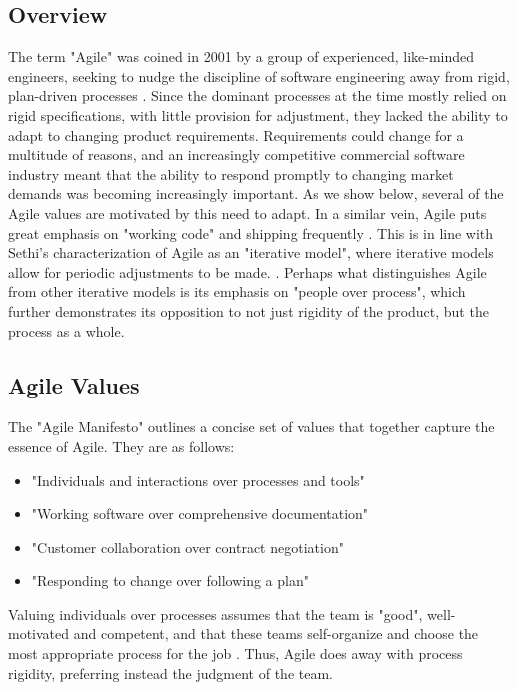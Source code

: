 \documentclass[11pt]{article}
\begin{document}
    \subsection{Overview}
    The term "Agile" was coined in 2001 by a group of experienced, like-minded engineers, seeking to nudge the discipline of software engineering away from rigid, plan-driven processes \citet{sethi}. Since the dominant processes at the time mostly relied on rigid specifications, with little provision for adjustment, they lacked the ability to adapt to changing product requirements. Requirements could change for a multitude of reasons, and an increasingly competitive commercial software industry meant that the ability to respond promptly to changing market demands was becoming increasingly important. As we show below, several of the Agile values are motivated by this need to adapt. In a similar vein, Agile puts great emphasis on "working code" and shipping frequently \citet{agilemanifesto}. This is in line with Sethi's characterization of Agile as an "iterative model", where iterative models allow for periodic adjustments to be made. \cite{sethi}. Perhaps what distinguishes Agile from other iterative models is its emphasis on "people over process", which further demonstrates its opposition to not just rigidity of the product, but the process as a whole.
    
    \subsection{Agile Values}
    The "Agile Manifesto" outlines a concise set of values that together capture the essence of Agile. They are as follows:

    \begin{itemize}
        \item "Individuals and interactions over processes and tools" \citet{agilemanifesto}
        \item "Working software over comprehensive documentation" \citet{agilemanifesto}
        \item "Customer collaboration over contract negotiation" \citet{agilemanifesto}
        \item "Responding to change over following a plan" \citet{agilemanifesto}
    \end{itemize}

    Valuing individuals over processes assumes that the team is "good", well-motivated and competent, and that these teams self-organize and choose the most appropriate process for the job \citet{agilemanifesto}. Thus, Agile does away with process rigidity, preferring instead the judgment of the team.
\end{document}
